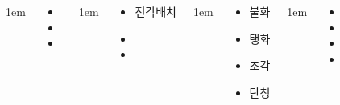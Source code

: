 \documentclass[	20pt, 
							a0paper, 
							landscape,
							margin=0mm, %
							innermargin=10mm,  		%
							blockverticalspace=4mm, %
							colspace=5mm, 
							subcolspace=0mm
							]{tikzposter}
\begin{document}
\begin{columns}
{\begin{LARGE}
\begin{itemize}
					\end{itemize}
				\end{LARGE}
			} %


			{
					\setlength{\leftmargini}{4em}
					\setlength{\labelsep} {1em}
				\begin{LARGE}
					\begin{itemize}
					\item 
					\item 
					\item 
					\end{itemize}
				\end{LARGE}
			} %



			{
					\setlength{\leftmargini}{4em}
					\setlength{\labelsep} {1em}
				\begin{LARGE}
					\begin{itemize}
					\item 전각배치
					\item 
					\item 
					\end{itemize}
				\end{LARGE}
			} %


			{
					\setlength{\leftmargini}{4em}
					\setlength{\labelsep} {1em}
				\begin{LARGE}
					\begin{itemize}
					\item 불화
					\item 탱화
					\item 조각 
					\item 단청

					\end{itemize}
				\end{LARGE}
			} %





			{
					\setlength{\leftmargini}{4em}
					\setlength{\labelsep} {1em}
				\begin{LARGE}
					\begin{itemize}
					\item 
					\item 
					\item 
					\item 
					\end{itemize}
				\end{LARGE}
			}


\end{columns}
\end{document}
